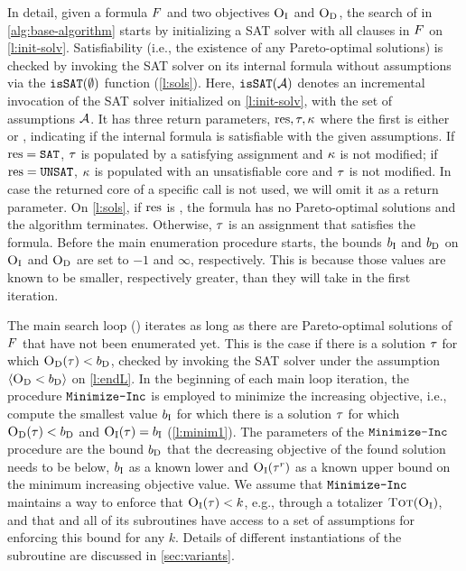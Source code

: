 In detail, given a formula $F$ and two objectives $\textsc{O}_{\text{I}}$ and $\textsc{O}_{\text{D}}$, the search of \algname{} in \cref{alg:base-algorithm} starts by initializing a SAT solver with all clauses in $F$ on \cref{l:init-solv}.
Satisfiability (i.e., the existence of any Pareto-optimal solutions) is checked by invoking the SAT solver on its internal formula without assumptions via the $\texttt{isSAT}(\emptyset)$ function (\cref{l:sols}).
Here, $\texttt{isSAT}(\mathcal{A})$ denotes an incremental invocation of the SAT solver initialized on \cref{l:init-solv}, with the set of assumptions $\mathcal{A}$.
It has three return parameters, $\text{res},\tau,\kappa$ where the first is either \sat{} or \unsat{}, indicating if the internal formula is satisfiable with the given assumptions.
If $\text{res}=\texttt{SAT}$, $\tau$ is populated by a satisfying assignment and $\kappa$ is not modified;
if $\text{res}=\texttt{UNSAT}$, $\kappa$ is populated with an unsatisfiable core and $\tau$ is not modified.
In case the returned core of a specific call is not used, we will omit it as a return parameter.
On \cref{l:sols}, if $\text{res}$ is \unsat{}, the formula has no Pareto-optimal solutions and the algorithm terminates.
Otherwise, $\tau$ is an assignment that satisfies the formula.
Before the main enumeration procedure starts, the bounds $b_{\text{I}}$ and $b_{\text{D}}$ on $\textsc{O}_{\text{I}}$ and $\textsc{O}_{\text{D}}$ are set to $-1$ and $\infty$, respectively.
This is because those values are known to be smaller, respectively greater, than they will take in the first iteration.

The main search loop () iterates as long as there are Pareto-optimal solutions of $F$ that have not been enumerated yet. 
This is the case if there is a solution $\tau$ for which $\textsc{O}_{\text{D}}(\tau) < b_{\text{D}}$, checked by invoking the SAT solver under the assumption $\langle \textsc{O}_{\text{D}} < b_{\text{D}} \rangle$ on \cref{l:endL}.
In the beginning of each main loop iteration, the procedure $\texttt{Minimize-\allowbreak{}Inc}$ is employed to minimize the increasing objective, i.e., compute the smallest value $b_{\text{I}}$ for which there is a solution $\tau$ for which $\textsc{O}_{\text{D}}(\tau) < b_{\text{D}}$ and $\textsc{O}_{\text{I}}(\tau) = b_{\text{I}}$  (\cref{l:minim1}). 
The parameters of the $\texttt{Minimize-\allowbreak{}Inc}$ procedure are the bound $b_{\text{D}}$ that the decreasing objective of the found solution needs to be below, $b_{\text{I}}$ as a known lower and $\textsc{O}_{\text{I}}(\tau^r)$ as a known upper bound on the minimum increasing objective value.
We assume that $\texttt{Minimize-\allowbreak{}Inc}$ maintains a way to enforce that $\textsc{O}_{\text{I}}(\tau) < k$, e.g., through a totalizer $\textsc{Tot}(\textsc{O}_{\text{I}})$, and that \algname{} and all of its subroutines have access to a set of assumptions for enforcing this bound for any $k$.
Details of different instantiations of the \Min{} subroutine are discussed in \cref{sec:variants}.

